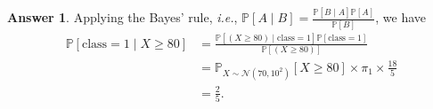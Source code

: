 \documentclass{article}
\newcommand{\probP}{\mathds{P}}
\theoremstyle{definition}
\newtheorem*{answer}{Answer}
\begin{document}
\begin{question}[start=1]
\begin{question}
		\begin{answer}
			Applying the Bayes' rule, \textit{i.e.}, $\probP[A\mid B] = \frac{\probP[B\mid A]\probP[A]}{\probP[B]}$, we have
			\begin{align*}
				\probP[\text{class} = 1 \mid X \geq 80] & = \frac{\probP[(X \geq 80) \mid \text{class} = 1] \probP[\text{class} = 1]}{\probP[(X \geq 80)]} \\
				& = \probP_{X \sim \mathcal{N}\left(70, 10^2\right)}[X \geq 80] \times \pi_1 \times \frac{18}{5} \\
				& = \frac{2}{5}.
			\end{align*}
		\end{answer}
	\end{question}
\end{question}
\end{document}
